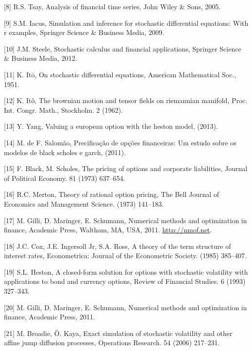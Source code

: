 \documentclass[12pt,twoside]{reedthesis}
\theoremstyle{definition}
\theoremstyle{definition}
\theoremstyle{remark}
\begin{document}
  \hypertarget{ref-tsay2005analysis}{}
  {[}8{]} R.S. Tsay, Analysis of financial time series, John Wiley \&
  Sons, 2005.
  
  \hypertarget{ref-iacus2009simulation}{}
  {[}9{]} S.M. Iacus, Simulation and inference for stochastic differential
  equations: With r examples, Springer Science \& Business Media, 2009.
  
  \hypertarget{ref-steele2012stochastic}{}
  {[}10{]} J.M. Steele, Stochastic calculus and financial applications,
  Springer Science \& Business Media, 2012.
  
  \hypertarget{ref-ito1951}{}
  {[}11{]} K. Itō, On stochastic differential equations, American
  Mathematical Soc., 1951.
  
  \hypertarget{ref-ito1962}{}
  {[}12{]} K. Itô, The brownian motion and tensor fields on riemannian
  manifold, Proc. Int. Congr. Math., Stockholm. 2 (1962).
  
  \hypertarget{ref-yang2013valuing}{}
  {[}13{]} Y. Yang, Valuing a european option with the heston model,
  (2013).
  
  \hypertarget{ref-salomao2011precificaccao}{}
  {[}14{]} M. de F. Salomão, Precificação de opções financeiras: Um estudo
  sobre os modelos de black scholes e garch, (2011).
  
  \hypertarget{ref-black1973pricing}{}
  {[}15{]} F. Black, M. Scholes, The pricing of options and corporate
  liabilities, Journal of Political Economy. 81 (1973) 637--654.
  
  \hypertarget{ref-merton1973theory}{}
  {[}16{]} R.C. Merton, Theory of rational option pricing, The Bell
  Journal of Economics and Management Science. (1973) 141--183.
  
  \hypertarget{ref-nmof}{}
  {[}17{]} M. Gilli, D. Maringer, E. Schumann, Numerical methods and
  optimization in finance, Academic Press, Waltham, MA, USA, 2011.
  \url{http://nmof.net}.
  
  \hypertarget{ref-cox1985theory}{}
  {[}18{]} J.C. Cox, J.E. Ingersoll Jr, S.A. Ross, A theory of the term
  structure of interest rates, Econometrica: Journal of the Econometric
  Society. (1985) 385--407.
  
  \hypertarget{ref-heston1993closed}{}
  {[}19{]} S.L. Heston, A closed-form solution for options with stochastic
  volatility with applications to bond and currency options, Review of
  Financial Studies. 6 (1993) 327--343.
  
  \hypertarget{ref-gilli_numerical_2011}{}
  {[}20{]} M. Gilli, D. Maringer, E. Schumann, Numerical methods and
  optimization in finance, Academic Press, 2011.
  
  \hypertarget{ref-broadie2006exact}{}
  {[}21{]} M. Broadie, Ö. Kaya, Exact simulation of stochastic volatility
  and other affine jump diffusion processes, Operations Research. 54
  (2006) 217--231.


\end{document}
